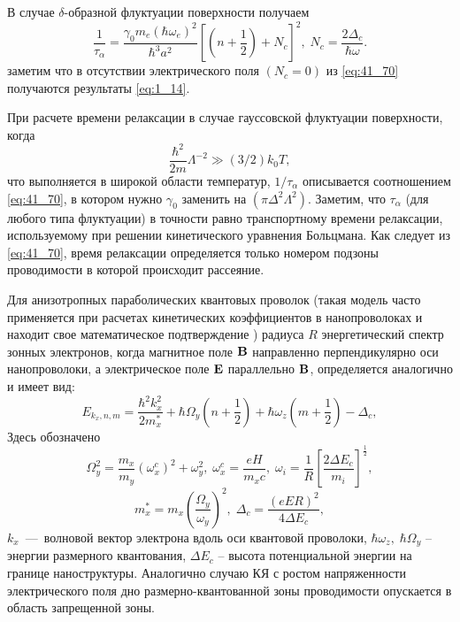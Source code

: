 В случае $\delta $-образной флуктуации поверхности получаем
\begin{equation} \label{eq:41_70}
\frac{1}{\tau _{\alpha } } =\frac{\gamma_0 m_e (\hbar\omega_e)^2 }{\hbar^3 a^2 } \left[\left(n+\frac{1}{2} \right)+N_c \right]^2, \;
N_c =\frac{2\Delta_c }{\hbar \omega } .
\end{equation}  
заметим что в отсутствии электрического поля $(N_c = 0)$ из \eqref{eq:41_70} получаются результаты \eqref{eq:1_14}.

При расчете времени релаксации в случае гауссовской флуктуации поверхности, когда
\[
\frac{\hbar^2 }{2m} \Lambda^{-2} \gg (3/2)k_0 T ,
\]
что выполняется в широкой области температур, $1 / \tau_{\alpha }$ описывается соотношением \eqref{eq:41_70}, в котором нужно $\gamma_0 $ заменить на $(\pi \Delta^2 \Lambda^2)$. Заметим, что $\tau_{\alpha } $ (для любого типа флуктуации) в точности равно транспортному времени релаксации, используемому при решении кинетического уравнения Больцмана. Как следует из \eqref{eq:41_70}, время релаксации определяется только номером подзоны проводимости в которой происходит рассеяние. 

Для анизотропных параболических квантовых проволок (такая модель часто применяется при расчетах кинетических коэффициентов в нанопроволоках \cite{Geiler1998,Geiler1999,Cros1992} и находит свое математическое подтверждение \cite{Beenakker1991}) радиуса $R$ энергетический спектр зонных электронов, когда магнитное поле $\boldsymbol{\mathbf{B}}$ направленно перпендикулярно оси нанопроволоки, а электрическое поле $\boldsymbol{\mathbf{E}}$ параллельно $\boldsymbol{\mathbf{B}}$, определяется аналогично \cite{Geiler1998} и имеет вид:
\begin{equation}
E_{k_x,n,m}=\frac{{\hbar }^2k^2_x}{2m^*_x}+\hbar {\Omega }_y\left(n+\frac{1}{2}\right)+\hbar {\omega }_z\left(m+\frac{1}{2}\right)-{\Delta }_c, 
\end{equation}
Здесь обозначено
\[
\Omega^2_y=\frac{m_x}{m_y}{\left({\omega }^c_x\right)}^2+\omega^2_y,\;
\omega^c_x=\frac{eH}{m_x c},\;
\omega_i=\frac{1}{R}{\left[\frac{2 \Delta E_c}{m_i}\right]}^{\frac{1}{2}},
\]
\[
m^*_x=m_x{\left(\frac{{\Omega }_y}{{\omega }_y}\right)}^2,\;
\Delta_c=\frac{{\left(eER\right)}^2}{4\Delta E_c},
\]
$k_x$~---~волновой вектор электрона вдоль оси квантовой проволоки, $\hbar \omega_z,\; \hbar \Omega_y$ -- энергии размерного квантования, $\Delta E_c$ -- высота потенциальной энергии на границе наноструктуры.
Аналогично случаю КЯ с ростом напряженности электрического поля дно размерно-квантованной зоны проводимости опускается в область запрещенной зоны.

